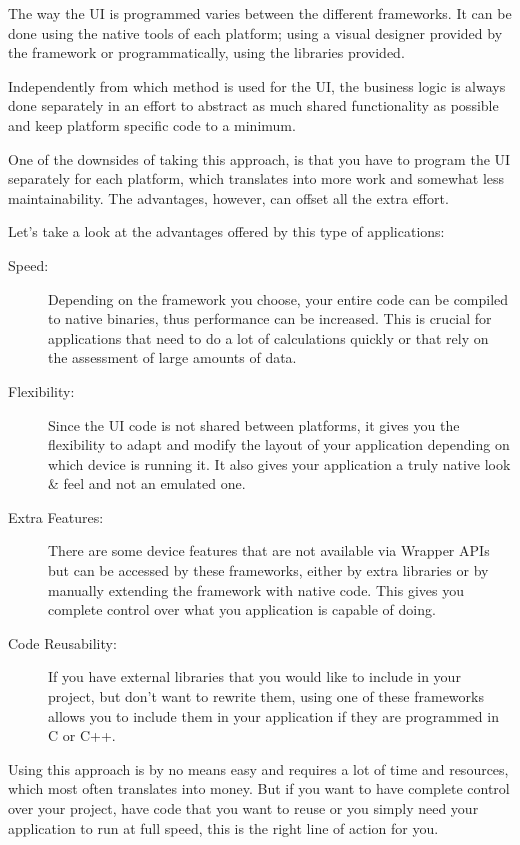 The way the \ac{UI} is programmed varies between the different frameworks. It can be done using the native tools of each platform; using a visual designer provided by the framework or programmatically, using the libraries provided.

Independently from which method is used for the \ac{UI}, the business logic is always done separately in an effort to abstract as much shared functionality as possible and keep platform specific code to a minimum.

One of the downsides of taking this approach, is that you have to program the \ac{UI} separately for each platform, which translates into more work and somewhat less maintainability. The advantages, however, can offset all the extra effort.

Let's take a look at the advantages offered by this type of applications:

\begin{description}

\item[Speed:] Depending on the framework you choose, your entire code can be compiled to native binaries, thus performance can be increased. This is crucial for applications that need to do a lot of calculations quickly or that rely on the assessment of large amounts of data.

\item[Flexibility:] Since the \ac{UI} code is not shared between platforms, it gives you the flexibility to adapt and modify the layout of your application depending on which device is running it. It also gives your application a truly native look \& feel and not an emulated one.

\item[Extra Features:] There are some device features that are not available via Wrapper \ac{API}s but can be accessed by these frameworks, either by extra libraries or by manually extending the framework with native code. This gives you complete control over what you application is capable of doing.
 
\item[Code Reusability:] If you have external libraries that you would like to include in your project, but don't want to rewrite them, using one of these frameworks allows you to include them in your application if they are programmed in C or C++. 

\end{description}

Using this approach is by no means easy and requires a lot of time and resources, which most often translates into money. But if you want to have complete control over your project, have code that you want to reuse or you simply need your application to run at full speed, this is the right line of action for you.